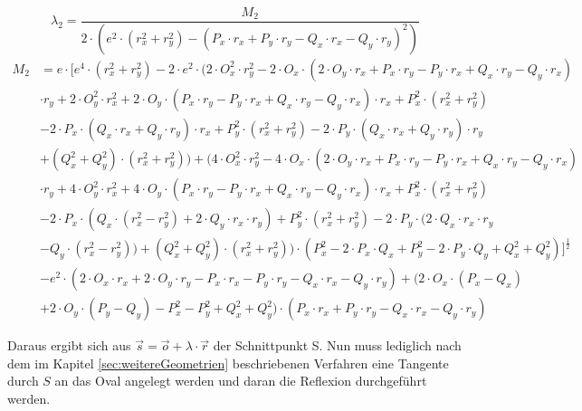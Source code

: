 \documentclass[reducespace,stylepage,semiarbeit]{spezidoc}
\begin{document}
\begin{equation*}
\lambda_2 = \dfrac{M_2}{2 \cdot (e^{2} \cdot (r_x^{2}+r_y^{2})-(P_x \cdot r_x+P_y \cdot r_y-Q_x \cdot r_x-Q_y \cdot r_y)^{2})}
\end{equation*}
\begin{equation*}
\begin{aligned}
M_2 &= e \cdot [e^{4} \cdot (r_x^{2} + r_y^{2}) - 2 \cdot e^{2} \cdot (2 \cdot O_x^{2} \cdot r_y^{2} - 2 \cdot O_x \cdot (2 \cdot O_y \cdot r_x + P_x \cdot r_y - P_y \cdot r_x + Q_x \cdot r_y - Q_y \cdot r_x) \\
& \cdot r_y + 2 \cdot O_y^{2} \cdot r_x^{2} + 2 \cdot O_y \cdot (P_x \cdot r_y - P_y \cdot r_x + Q_x \cdot r_y - Q_y \cdot r_x) \cdot r_x + P_x^{2} \cdot (r_x^{2} + r_y^{2}) \\
& - 2 \cdot P_x \cdot (Q_x \cdot r_x + Q_y \cdot r_y) \cdot r_x + P_y^{2} \cdot (r_x^{2} + r_y^{2}) - 2 \cdot P_y \cdot (Q_x \cdot r_x + Q_y \cdot r_y) \cdot r_y \\
&+ (Q_x^{2} + Q_y^{2}) \cdot (r_x^{2} + r_y^{2})) + (4 \cdot O_x^{2} \cdot r_y^{2} - 4 \cdot O_x \cdot (2 \cdot O_y \cdot r_x + P_x \cdot r_y - P_y \cdot r_x + Q_x \cdot r_y - Q_y \cdot r_x) \\
&\cdot r_y + 4 \cdot O_y^{2} \cdot r_x^{2} + 4 \cdot O_y \cdot (P_x \cdot r_y - P_y \cdot r_x + Q_x \cdot r_y - Q_y \cdot r_x) \cdot r_x + P_x^{2} \cdot (r_x^{2} + r_y^{2}) \\
&- 2 \cdot P_x \cdot (Q_x \cdot (r_x^{2} - r_y^{2}) + 2 \cdot Q_y \cdot r_x \cdot r_y) + P_y^{2} \cdot (r_x^{2} + r_y^{2}) - 2 \cdot P_y \cdot (2 \cdot Q_x \cdot r_x \cdot r_y \\
&- Q_y \cdot (r_x^{2} - r_y^{2})) + (Q_x^{2} + Q_y^{2}) \cdot (r_x^{2} + r_y^{2})) \cdot (P_x^{2} - 2 \cdot P_x \cdot Q_x + P_y^{2} - 2 \cdot P_y \cdot Q_y + Q_x^{2} + Q_y^{2})]^{\frac{1}{2}} \\
&- e^{2} \cdot (2 \cdot O_x \cdot r_x + 2 \cdot O_y \cdot r_y - P_x \cdot r_x - P_y \cdot r_y - Q_x \cdot r_x - Q_y \cdot r_y) + (2 \cdot O_x \cdot (P_x - Q_x) \\
&+ 2 \cdot O_y \cdot (P_y - Q_y) - P_x^{2} - P_y^{2} + Q_x^{2} + Q_y^{2}) \cdot (P_x \cdot r_x + P_y \cdot r_y - Q_x \cdot r_x - Q_y \cdot r_y)
\end{aligned}
\end{equation*}

Daraus ergibt sich aus $\vec{s} = \vec{o} + \lambda \cdot \vec{r}$ der Schnittpunkt S. Nun muss lediglich nach dem im Kapitel \ref{sec:weitereGeometrien} beschriebenen Verfahren eine Tangente durch $S$ an das Oval angelegt werden und daran die Reflexion durchgeführt werden.
\end{document}
